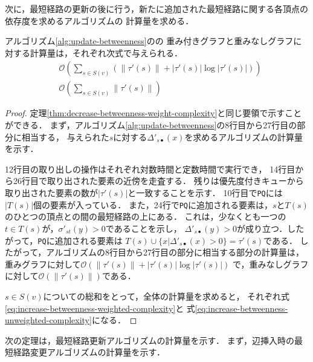 次に，最短経路の更新の後に行う，新たに追加された最短経路に関する各頂点の依存度を求めるアルゴリズムの
計算量を求める．

\begin{theorem}
  \label{thm:increase-betweenness-weight-complexity}
  アルゴリズム\ref{alg:update-betweenness}のの
  重み付きグラフと重みなしグラフに対する計算量は，それぞれ次式で与えられる．
  \begin{align}
    &\mathcal{O}(\sum_{s\in S(v)}(\|\tau'(s)\|+|\tau'(s)|\log|\tau'(s)|))
    \label{eq:increase-betweenness-weighted-complexity} \\
    &\mathcal{O}(\sum_{s\in S(v)}\|\tau'(s)\|)
    \label{eq:increase-betweenness-unweighted-complexity}
  \end{align}
\end{theorem}
\begin{proof}
  定理\ref{thm:decrease-betweenness-weight-complexity}と同じ要領で示すことができる．
  まず，アルゴリズム\ref{alg:update-betweenness}の8行目から27行目の部分に相当する，
  与えられた$s$に対する$\Delta'_{s\bullet}(x)$を求めるアルゴリズムの計算量を示す．

  12行目の取り出しの操作はそれぞれ対数時間と定数時間で実行でき，
  14行目から26行目で取り出された要素の近傍を走査する．
  残りは優先度付きキューから取り出された要素の数が$|\tau'(s)|$と一致することを示す．
  10行目で\texttt{PQ}には$|T(s)|$個の要素が入っている．
  また，24行で\texttt{PQ}に追加される要素は，$s$と$T(s)$のひとつの頂点との間の最短経路の上にある．
  これは，少なくとも一つの$t\in T(s)$が，$\sigma'_{st}(y)>0$であることを示し，
  $\Delta'_{s\bullet}(y)>0$が成り立つ．したがって，\texttt{PQ}に追加される要素は
  $T(s)\cup\{x|\Delta'_{s\bullet}(x)>0\}=\tau'(s)$である．
  したがって，アルゴリズムの8行目から27行目の部分に相当する部分の計算量は，
  重みグラフに対して$\mathcal{O}(\|\tau'(s)\|+|\tau'(s)|\log|\tau'(s)|)$
  で，重みなしグラフに対して$\mathcal{O}(\|\tau'(s)\|)$である．

  $s\in S(v)$についての総和をとって，全体の計算量を求めると，
  それぞれ式\eqref{eq:increase-betweenness-weighted-complexity}と
  式\eqref{eq:increase-betweenness-unweighted-complexity}になる．

\end{proof}

次の定理は，最短経路更新アルゴリズムの計算量を示す．
まず，辺挿入時の最短経路変更アルゴリズムの計算量を示す．

